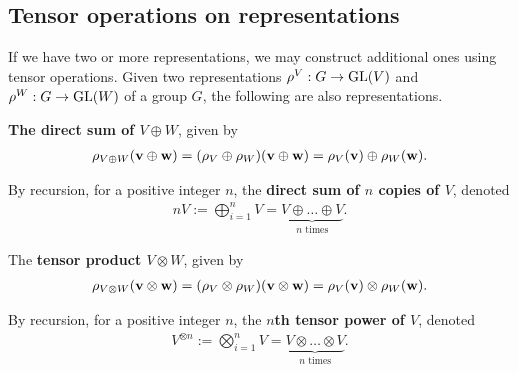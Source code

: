 \subsection{Tensor operations on representations}\label{sect:tensorrepr}

If we have two or more representations, we may construct additional ones using tensor operations. Given two representations $\rho^V: G \rightarrow \text{GL}(V)$ and $\rho^W: G \rightarrow \text{GL}(W)$ of a group $G$, the following are also representations.

\textbf{The direct sum of $V \oplus W$}, given by 
\begin{align*}
	\rho_{V \oplus W}(\mathbf{v} \oplus \mathbf{w}) = (\rho_V \oplus \rho_W)(\mathbf{v} \oplus \mathbf{w}) = \rho_V(\mathbf{v}) \oplus \rho_W(\mathbf{w}).
\end{align*}

By recursion, for a positive integer $n$, the \textbf{direct sum of $n$ copies of $V$}, denoted
\begin{align*}
	nV := \bigoplus_{i=1}^n V = \underset{\text{$n$ times}}{\underbrace{V \oplus \dots \oplus V}}.
\end{align*}

The \textbf{tensor product $V \otimes W$}, given by
\begin{align*}
	\rho_{V \otimes W}(\mathbf{v} \otimes \mathbf{w}) = (\rho_V \otimes \rho_W)(\mathbf{v} \otimes \mathbf{w}) = \rho_V(\mathbf{v}) \otimes \rho_W(\mathbf{w}).
\end{align*}

By recursion, for a positive integer $n$, the \textbf{$n$th tensor power of $V$}, denoted
\begin{align*}
	V^{\otimes n} := \bigotimes_{i=1}^n V = \underset{\text{$n$ times}}{\underbrace{V \otimes \dots \otimes V}}.
\end{align*}






	
